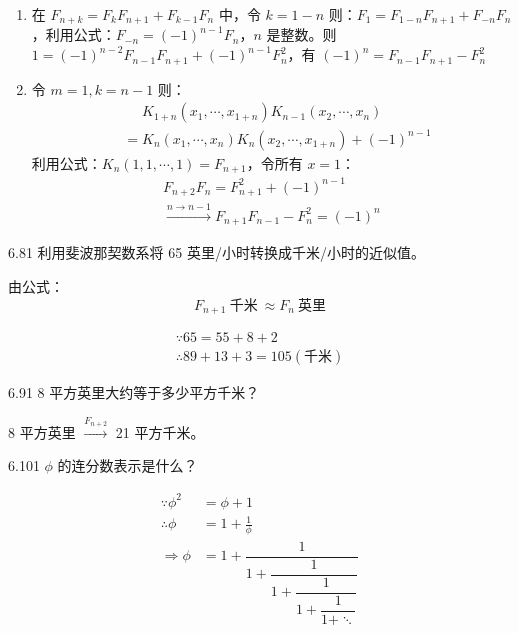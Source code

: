 \begin{enumerate}
  \item[1.] 在 \( F_{n+k} = F_k F_{n+1} + F_{k-1} F_n \) 中，令 \( k = 1-n \) 则：\( F_1 = F_{1-n} F_{n+1} + F_{-n} F_n \)，利用公式：\( F_{-n} = (-1)^{n-1} F_n \)，\( n \) 是整数。则 \( 1 = (-1)^{n-2} F_{n-1} F_{n+1} + (-1)^{n-1} F_n^2 \)，有 \( (-1)^n = F_{n-1} F_{n+1} - F_n^2 \)
  \item[2.] 令 \( m = 1, k = n-1 \) 则：
    \begin{align*}
      &\phantom{=} K_{1+n}(x_1, \cdots, x_{1+n}) K_{n-1}(x_2, \cdots, x_n) \\
      &= K_n(x_1, \cdots, x_n) K_n(x_2, \cdots, x_{1+n}) + (-1)^{n-1}
    \end{align*}
    利用公式：\( K_n(1, 1, \cdots, 1) = F_{n+1} \)，令所有 \( x = 1 \)：
    \begin{gather*}
      F_{n+2} F_n = F_{n+1}^2 + (-1)^{n-1} \\
      \xrightarrow{n \to n-1} F_{n+1} F_{n-1} - F_n^2 = (-1)^n
    \end{gather*}
\end{enumerate}

\begin{problem}{6.8}{1}
  利用斐波那契数系将 65 英里/小时转换成千米/小时的近似值。
\end{problem}

由公式：
\[
  \boxed{F_{n+1} \ \text{千米} \ \approx F_n \ \text{英里}}
\]

\begin{gather*}
  \because 65 = 55 + 8 + 2 \\
  \therefore 89 + 13 + 3 = 105 (\text{千米})
\end{gather*}

\begin{problem}{6.9}{1}
  8 平方英里大约等于多少平方千米？
\end{problem}

8 平方英里 \( \xrightarrow{F_{n+2}} \) 21 平方千米。

\begin{problem}{6.10}{1}
  \( \phi \) 的连分数表示是什么？
\end{problem}

\begin{align*}
  \because \phi^2 &= \phi + 1 \\
  \therefore \phi &= 1 + \frac{1}{\phi} \\
  \Rightarrow \phi &= 1 + \dfrac{1}{1 + \dfrac{1}{1 + \dfrac{1}{1 + \dfrac{1}{1 + \ddots}}}}
\end{align*}

